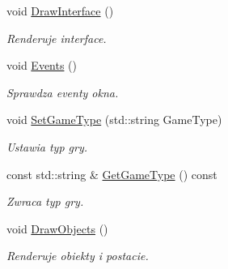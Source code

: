 \begin{DoxyCompactItemize}
\mbox{\label{classtfp_1_1_game_a21edf8383926979f8d2c96704c19c791}} 
void \mbox{\hyperlink{classtfp_1_1_game_a21edf8383926979f8d2c96704c19c791}{Draw\+Interface}} ()
\begin{DoxyCompactList}\small\item\em Renderuje interface. \end{DoxyCompactList}\item 
void \mbox{\hyperlink{classtfp_1_1_game_ace5f19e68b37a3fc6be123a94ee898c7}{Events}} ()
\begin{DoxyCompactList}\small\item\em Sprawdza eventy okna. \end{DoxyCompactList}\item 
\mbox{\label{classtfp_1_1_game_ae4f8dfe1e226a6241173ecdcdd2068f8}} 
void \mbox{\hyperlink{classtfp_1_1_game_ae4f8dfe1e226a6241173ecdcdd2068f8}{Set\+Game\+Type}} (std\+::string Game\+Type)
\begin{DoxyCompactList}\small\item\em Ustawia typ gry. \end{DoxyCompactList}\item 
\mbox{\label{classtfp_1_1_game_a7eed64d1b9d87adf55effc5defe2f5b7}} 
const std\+::string \& \mbox{\hyperlink{classtfp_1_1_game_a7eed64d1b9d87adf55effc5defe2f5b7}{Get\+Game\+Type}} () const
\begin{DoxyCompactList}\small\item\em Zwraca typ gry. \end{DoxyCompactList}\item 
\mbox{\label{classtfp_1_1_game_abc3ff8b0706cd9582cc4ecbc83311431}} 
void \mbox{\hyperlink{classtfp_1_1_game_abc3ff8b0706cd9582cc4ecbc83311431}{Draw\+Objects}} ()
\begin{DoxyCompactList}\small\item\em Renderuje obiekty i postacie. \end{DoxyCompactList}\end{DoxyCompactItemize}
